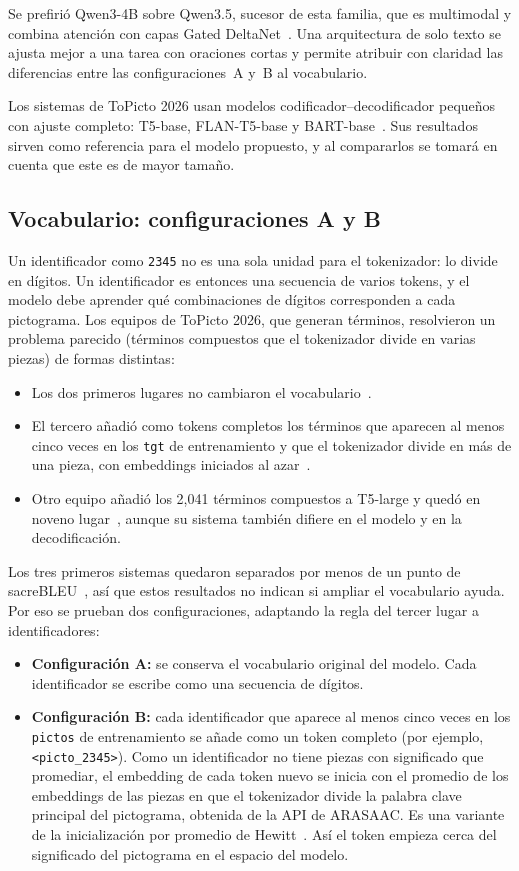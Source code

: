 Se prefirió Qwen3-4B sobre Qwen3.5, sucesor de esta familia, que es multimodal y combina atención con capas Gated DeltaNet~\cite{qwen35card}. Una arquitectura de solo texto se ajusta mejor a una tarea con oraciones cortas y permite atribuir con claridad las diferencias entre las configuraciones~A y~B al vocabulario.

Los sistemas de ToPicto 2026 usan modelos codificador--decodificador pequeños con ajuste completo: T5-base, FLAN-T5-base y BART-base~\cite{Sudharshan2026,GuzmanColomina2026,Gokul2026}. Sus resultados sirven como referencia para el modelo propuesto, y al compararlos se tomará en cuenta que este es de mayor tamaño.

\subsection{Vocabulario: configuraciones A y B}
Un identificador como \texttt{2345} no es una sola unidad para el tokenizador: lo divide en dígitos. Un identificador es entonces una secuencia de varios tokens, y el modelo debe aprender qué combinaciones de dígitos corresponden a cada pictograma. Los equipos de ToPicto 2026, que generan términos, resolvieron un problema parecido (términos compuestos que el tokenizador divide en varias piezas) de formas distintas:
\begin{itemize}
    \item Los dos primeros lugares no cambiaron el vocabulario~\citep{Sudharshan2026,GuzmanColomina2026}.
    \item El tercero añadió como tokens completos los términos que aparecen al menos cinco veces en los \texttt{tgt} de entrenamiento y que el tokenizador divide en más de una pieza, con embeddings iniciados al azar~\citep{Gokul2026}.
    \item Otro equipo añadió los 2,041 términos compuestos a T5-large y quedó en noveno lugar~\citep{Adithiyaa2026}, aunque su sistema también difiere en el modelo y en la decodificación.
\end{itemize}
Los tres primeros sistemas quedaron separados por menos de un punto de sacreBLEU~\citep{Hjuler2026}, así que estos resultados no indican si ampliar el vocabulario ayuda. Por eso se prueban dos configuraciones, adaptando la regla del tercer lugar a identificadores:
\begin{itemize}
    \item \textbf{Configuración A:} se conserva el vocabulario original del modelo. Cada identificador se escribe como una secuencia de dígitos.
    \item \textbf{Configuración B:} cada identificador que aparece al menos cinco veces en los \texttt{pictos} de entrenamiento se añade como un token completo (por ejemplo, \texttt{\textless picto\_2345\textgreater}). Como un identificador no tiene piezas con significado que promediar, el embedding de cada token nuevo se inicia con el promedio de los embeddings de las piezas en que el tokenizador divide la palabra clave principal del pictograma, obtenida de la API de ARASAAC. Es una variante de la inicialización por promedio de Hewitt~\citep{hewitt2021initializing}. Así el token empieza cerca del significado del pictograma en el espacio del modelo.
\end{itemize}

